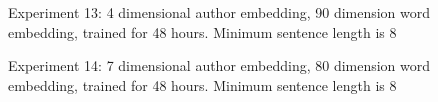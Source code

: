 \documentclass{article}%
\begin{document}
\begin{figure}
\noindent{}
\caption{Experiment 13: 4 dimensional author embedding, 90 dimension word embedding, trained for 48 hours. Minimum sentence length is 8}
\end{figure}
\begin{figure}
\noindent{}
\caption{Experiment 14: 7 dimensional author embedding, 80 dimension word embedding, trained for 48 hours. Minimum sentence length is 8}
\end{figure}
\end{document}
